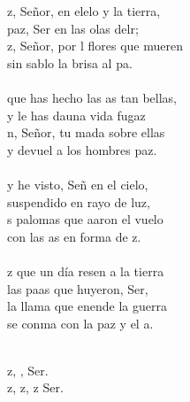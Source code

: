 \begin{cancion}%
	z, Señor, en elelo y la tierra,\\
	paz, Ser en las olas delr;\\
	z, Señor, por l flores que mueren\\
	sin sablo la brisa al pa.\\
\jump\\
	 que has hecho las as tan bellas, \\
	y le has dauna vida fugaz\\
	n, Señor, tu mada sobre ellas\\
	y devuel a los hombres paz.\\
\jump\\
	y he visto, Señ en el cielo, \\
	suspendido en rayo de luz,\\
	s palomas que aaron el vuelo\\
	con las as en forma de z.\\
\jump\\
	z que un día resen a la tierra\\
	las paas que huyeron, Ser,\\
	la llama que enende la guerra\\
	se conma con la paz y el a.\\\jump\\
	\begin{chorus}%
	z, ,  Ser.\\
	z, z, z Ser.\\
	\end{chorus}%
	\jump\\
\end{cancion}%
